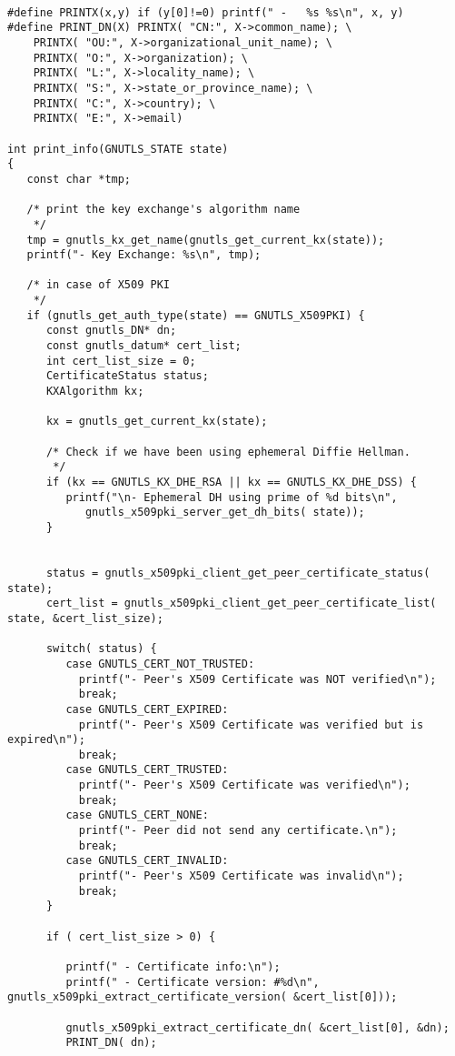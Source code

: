 \begin{verbatim}

#define PRINTX(x,y) if (y[0]!=0) printf(" -   %s %s\n", x, y)
#define PRINT_DN(X) PRINTX( "CN:", X->common_name); \
	PRINTX( "OU:", X->organizational_unit_name); \
	PRINTX( "O:", X->organization); \
	PRINTX( "L:", X->locality_name); \
	PRINTX( "S:", X->state_or_province_name); \
	PRINTX( "C:", X->country); \
	PRINTX( "E:", X->email)

int print_info(GNUTLS_STATE state)
{
   const char *tmp;

   /* print the key exchange's algorithm name
    */
   tmp = gnutls_kx_get_name(gnutls_get_current_kx(state));
   printf("- Key Exchange: %s\n", tmp);

   /* in case of X509 PKI
    */
   if (gnutls_get_auth_type(state) == GNUTLS_X509PKI) {
      const gnutls_DN* dn;
      const gnutls_datum* cert_list;
      int cert_list_size = 0;
      CertificateStatus status;
      KXAlgorithm kx;

      kx = gnutls_get_current_kx(state);

      /* Check if we have been using ephemeral Diffie Hellman.
       */
      if (kx == GNUTLS_KX_DHE_RSA || kx == GNUTLS_KX_DHE_DSS) {
         printf("\n- Ephemeral DH using prime of %d bits\n",
            gnutls_x509pki_server_get_dh_bits( state));
      }


      status = gnutls_x509pki_client_get_peer_certificate_status( state);
      cert_list = gnutls_x509pki_client_get_peer_certificate_list( state, &cert_list_size);

      switch( status) {
         case GNUTLS_CERT_NOT_TRUSTED:
           printf("- Peer's X509 Certificate was NOT verified\n");
           break;
         case GNUTLS_CERT_EXPIRED:
           printf("- Peer's X509 Certificate was verified but is expired\n");
           break;
         case GNUTLS_CERT_TRUSTED:
           printf("- Peer's X509 Certificate was verified\n");
           break;
         case GNUTLS_CERT_NONE:
           printf("- Peer did not send any certificate.\n");
           break;
         case GNUTLS_CERT_INVALID:
           printf("- Peer's X509 Certificate was invalid\n");
           break;
      }
		
      if ( cert_list_size > 0) {

         printf(" - Certificate info:\n");
         printf(" - Certificate version: #%d\n", gnutls_x509pki_extract_certificate_version( &cert_list[0]));

         gnutls_x509pki_extract_certificate_dn( &cert_list[0], &dn);
         PRINT_DN( dn);


\end{verbatim}
